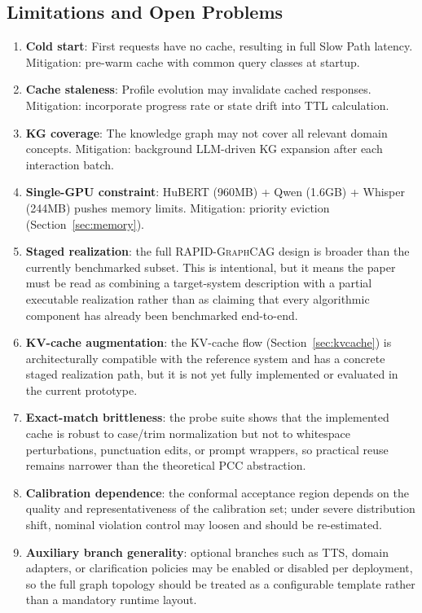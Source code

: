 \documentclass[11pt,a4paper,twocolumn]{article}
\newcommand{\rapid}{\textsc{RAPID-GraphCAG}}
\begin{document}
\subsection{Limitations and Open Problems}

\begin{enumerate}[leftmargin=*]
  \item \textbf{Cold start}: First requests have no cache, resulting in full Slow Path latency. Mitigation: pre-warm cache with common query classes at startup.
  \item \textbf{Cache staleness}: Profile evolution may invalidate cached responses. Mitigation: incorporate progress rate or state drift into TTL calculation.
  \item \textbf{KG coverage}: The knowledge graph may not cover all relevant domain concepts. Mitigation: background LLM-driven KG expansion after each interaction batch.
  \item \textbf{Single-GPU constraint}: HuBERT (960MB) + Qwen (1.6GB) + Whisper (244MB) pushes memory limits. Mitigation: priority eviction (Section~\ref{sec:memory}).
  \item \textbf{Staged realization}: the full \rapid{} design is broader than the currently benchmarked subset. This is intentional, but it means the paper must be read as combining a target-system description with a partial executable realization rather than as claiming that every algorithmic component has already been benchmarked end-to-end.
  \item \textbf{KV-cache augmentation}: the KV-cache flow (Section~\ref{sec:kvcache}) is architecturally compatible with the reference system and has a concrete staged realization path, but it is not yet fully implemented or evaluated in the current prototype.
  \item \textbf{Exact-match brittleness}: the probe suite shows that the implemented cache is robust to case/trim normalization but not to whitespace perturbations, punctuation edits, or prompt wrappers, so practical reuse remains narrower than the theoretical PCC abstraction.
  \item \textbf{Calibration dependence}: the conformal acceptance region depends on the quality and representativeness of the calibration set; under severe distribution shift, nominal violation control may loosen and should be re-estimated.
  \item \textbf{Auxiliary branch generality}: optional branches such as TTS, domain adapters, or clarification policies may be enabled or disabled per deployment, so the full graph topology should be treated as a configurable template rather than a mandatory runtime layout.
\end{enumerate}
\end{document}
